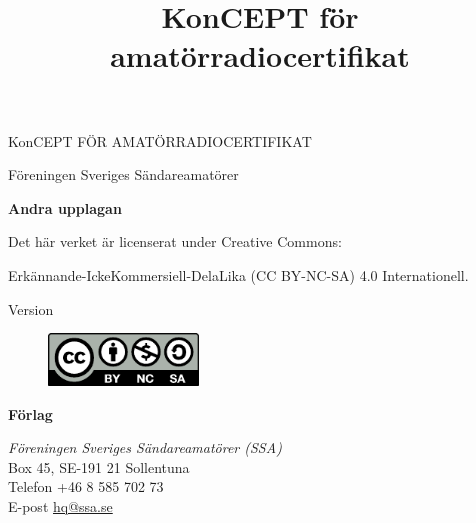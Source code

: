 \vspace{10em}
\title{KonCEPT för amatörradiocertifikat}
\begin{center}
\Large{KonCEPT FÖR AMATÖRRADIOCERTIFIKAT}

Föreningen Sveriges Sändareamatörer\\[2\baselineskip]
\end{center}


\noindent \textbf{Andra upplagan}

\noindent

\noindent Det här verket är licenserat under Creative Commons:

\noindent Erkännande-IckeKommersiell-DelaLika (CC BY-NC-SA) 4.0 Internationell.

\noindent Version \revision

\begin{figure}
    \includegraphics[width=4cm]{images/cc-by-nc-sa}
\end{figure}


\vfill

\noindent
\textbf{Förlag}

\noindent
\textit{Föreningen Sveriges Sändareamatörer (SSA)}\\
Box 45, SE-191 21 Sollentuna\\
Telefon +46 8 585 702 73\\
E-post \href{mailto:hq@ssa.se}{hq@ssa.se}\\[\baselineskip]
